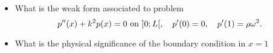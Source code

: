 \bexo



\begin{itemize}
	\item 
What is the weak form associated to problem
\begin{equation}
	p''(x)+k^2p(x)=0 \textrm{ on } ]0;L[, \quad p'(0)=0 , \quad p'(1)=\rho\omega^2. 
\end{equation}

	\item What is the physical significance of the boundary condition in $x=1$
\end{itemize}
\eexo

